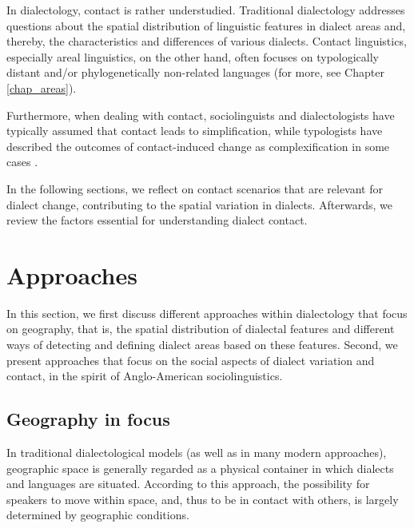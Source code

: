 \documentclass[output=paper]{langscibook}
\begin{document}
In dialectology, contact is rather understudied. Traditional dialectology addresses questions about the spatial distribution of linguistic features in dialect areas and, thereby, the characteristics and differences of various dialects. Contact linguistics, especially areal linguistics, on the other hand, often focuses on typologically distant and/or phylogenetically non-related languages (for more, see Chapter \ref{chap_areas}).

Furthermore, when dealing with contact, sociolinguists and dialectologists have typically assumed that contact leads to simplification, while typologists have described the outcomes of contact-induced change as complexification in some cases \parencite[13--23]{Trudgill.2011}.

In the following sections, we reflect on contact scenarios that are relevant for dialect change, contributing to the spatial variation in dialects. Afterwards, we review the factors  essential for understanding dialect contact.

\section{Approaches} 
\label{Section:Approaches}

 In this section, we first discuss different approaches within dialectology that focus on geography, that is, the spatial distribution of dialectal features and different ways of detecting and defining dialect areas based on these features. Second, we  present approaches that focus on the social aspects of dialect variation and contact, in the spirit of Anglo-American sociolinguistics. 

\subsection{Geography in focus}
\label{Approaches: geography in focus}
In traditional dialectological models (as well as in many modern approaches), geographic space is generally regarded as a physical container in which dialects and languages are situated. According to this approach, the possibility for speakers to move within space, and, thus to be in contact with others, is largely determined by geographic conditions. 
\end{document}
